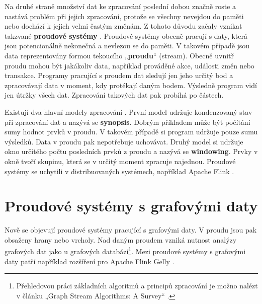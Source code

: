 Na druhé straně množství dat ke zpracování poslední dobou značně roste a nastává problém při jejich zpracování, protože se všechny nevejdou do paměti nebo dochází k jejich velmi častým změnám.  
Z tohoto důvodu začaly vznikat takzvané \textbf{proudové systémy} \citep{streaming}.
Proudové systémy obecně pracují s daty, která jsou potencionálně nekonečná a nevlezou se do paměti.
V takovém případě jsou data reprezentovány formou tekoucího „\textbf{proudu}“ (stream).
Obecně uvnitř proudu mohou být jakákoliv data, například prováděné akce, události změn nebo transakce.
Programy pracující s proudem dat sledují jen jeho určitý bod a zpracovávají data v moment, kdy protékají daným bodem.
Výsledně program vidí jen útržky všech dat.
Zpracování takových dat pak probíhá po částech.

Existují dva hlavní modely zpracování \citep{graphstreaming}.
První model udržuje kondenzovaný stav při zpracování dat a nazývá se \textbf{synopsis}.
Dobrým příkladem může být počítání sumy hodnot prvků v proudu.
V takovém případě si program udržuje pouze sumu výsledků.
Data v proudu pak nepotřebuje uchovávat.
Druhý model si udržuje okno určitého počtu posledních prvků z proudu a nazývá se \textbf{windowing}.
Prvky v okně tvoří skupinu, která se v určitý moment zpracuje najednou.
Proudové systémy se uchytili v distribuovaných systémech, například Apache Flink \citep{apacheflink}.

\section*{Proudové systémy s grafovými daty}

Nově se objevují proudové systémy pracující s grafovými daty.
V proudu jsou pak obsaženy hrany nebo vrcholy. 
Nad daným proudem vzniká nutnost analýzy grafových dat jako u grafových databází\footnote{Přehledovou práci základních algoritmů a principů zpracování je možno nalézt v článku „Graph Stream Algorithms: A Survey“ \citep{graphstreamalgorithms}.}.
Mezi proudové systémy s grafovými daty patří například rozšíření pro Apache Flink Gelly \citep{apacheflinkgelly}.

